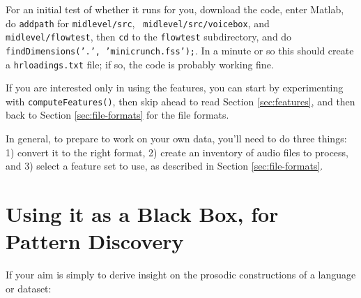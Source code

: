 \documentclass[11pt]{article}
\begin{document}
For an initial test of whether it runs for you, download the code,
enter Matlab, do {\tt addpath} for {\tt midlevel/src}, {\tt
  midlevel/src/voicebox}, and {\tt midlevel/flowtest}, then {\tt cd}
to the {\tt flowtest} subdirectory, and do {\tt
  findDimensions('.', 'minicrunch.fss');}. In a minute or
so this should create a {\tt hrloadings.txt} file; if so, the code is
probably working fine.

If you are interested only in using the features, you can start by
experimenting with {\tt computeFeatures()}, then skip ahead to read Section
\ref{sec:features}, and then back to Section \ref{sec:file-formats}
for the file formats.

In general, to prepare to work on your own data, you'll need to do
three things: 1) convert it to the right format, 2) create an
inventory of audio files to process, and 3) select a feature set to
use, as described in Section \ref{sec:file-formats}.


\section{Using it as a Black Box, for Pattern Discovery} \label{sec:blackbox}

If your aim is simply to derive insight on the prosodic constructions
of a language or dataset:
\end{document}
